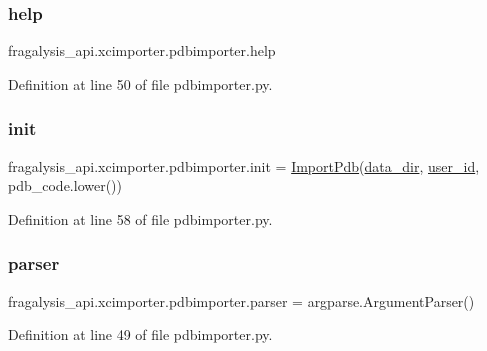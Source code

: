 \subsubsection{\texorpdfstring{help}{help}}
{\footnotesize\ttfamily fragalysis\+\_\+api.\+xcimporter.\+pdbimporter.\+help}



Definition at line 50 of file pdbimporter.\+py.

\mbox{\label{namespacefragalysis__api_1_1xcimporter_1_1pdbimporter_a3ad00a74050cce6bc31b2b0c736ba739}} 
\subsubsection{\texorpdfstring{init}{init}}
{\footnotesize\ttfamily fragalysis\+\_\+api.\+xcimporter.\+pdbimporter.\+init = \hyperlink{classfragalysis__api_1_1xcimporter_1_1pdbimporter_1_1_import_pdb}{Import\+Pdb}(\hyperlink{namespacefragalysis__api_1_1xcimporter_1_1pdbimporter_a1bf97f08674fecb515e86341fcdbd853}{data\+\_\+dir}, \hyperlink{namespacefragalysis__api_1_1xcimporter_1_1pdbimporter_a9cee2acc4fc991cee1a09431247027f9}{user\+\_\+id}, pdb\+\_\+code.\+lower())}



Definition at line 58 of file pdbimporter.\+py.

\mbox{\label{namespacefragalysis__api_1_1xcimporter_1_1pdbimporter_a5b23293cbebeaca77c09ce42825f5193}} 
\subsubsection{\texorpdfstring{parser}{parser}}
{\footnotesize\ttfamily fragalysis\+\_\+api.\+xcimporter.\+pdbimporter.\+parser = argparse.\+Argument\+Parser()}



Definition at line 49 of file pdbimporter.\+py.

